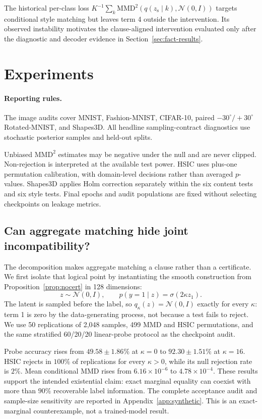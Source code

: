 \documentclass{article}
\newcommand{\zs}{z_{\mathrm{s}}}
\newcommand{\MMD}{\mathrm{MMD}}
\begin{document}
The historical per-class loss
$K^{-1}\sum_k\MMD^2(q(\zs\mid k),\mathcal N(0,I))$ targets conditional style
matching but leaves term 4 outside the intervention.  Its observed instability
motivates the clause-aligned intervention evaluated only after the diagnostic
and decoder evidence in Section~\ref{sec:fact-results}.

\section{Experiments}
\label{sec:experiments}


\paragraph{Reporting rules.}
The image audits cover MNIST, Fashion-MNIST, CIFAR-10,
paired $-30^\circ/+30^\circ$ Rotated-MNIST, and Shapes3D.  All headline
sampling-contract diagnostics use stochastic posterior samples and held-out
splits.

Unbiased $\MMD^2$ estimates may be negative under the null and are never
clipped.  Non-rejection is interpreted at the available test power.  HSIC uses
plus-one permutation calibration, with domain-level decisions rather than
averaged $p$-values.  Shapes3D applies Holm correction separately within the
six content tests and six style tests.  Final epochs and audit populations are
fixed without selecting checkpoints on leakage metrics.

\subsection{Can aggregate matching hide joint incompatibility?}
\label{sec:synthetic}

The decomposition makes aggregate matching a clause rather than a certificate.
We first isolate that logical point by instantiating the smooth construction from
Proposition~\ref{prop:nocert} in 128 dimensions:
\begin{equation}
z\sim\mathcal N(0,I),\qquad
p(y=1\mid z)=\sigma(2\kappa z_1).
\end{equation}
The latent is sampled before the label, so $q_\kappa(z)=\mathcal N(0,I)$
exactly for every $\kappa$: term 1 is zero by the data-generating process, not
because a test fails to reject.  We use 50 replications of 2,048 samples, 499
MMD and HSIC permutations, and the same stratified 60/20/20 linear-probe
protocol as the checkpoint audit.

Probe accuracy rises from $49.58\!\pm\!1.86\%$ at $\kappa=0$ to
$92.30\!\pm\!1.51\%$ at $\kappa=16$.  HSIC rejects in $100\%$ of replications
for every $\kappa>0$, while its null rejection rate is $2\%$.  Mean
conditional MMD rises from $6.16\times10^{-6}$ to
$4.78\times10^{-4}$.  These results support the intended existential claim:
exact marginal equality can coexist with more than $90\%$ recoverable label
information.  The complete acceptance audit and sample-size sensitivity are
reported in Appendix~\ref{app:synthetic}.  This is an exact-marginal
counterexample, not a trained-model result.
\end{document}
